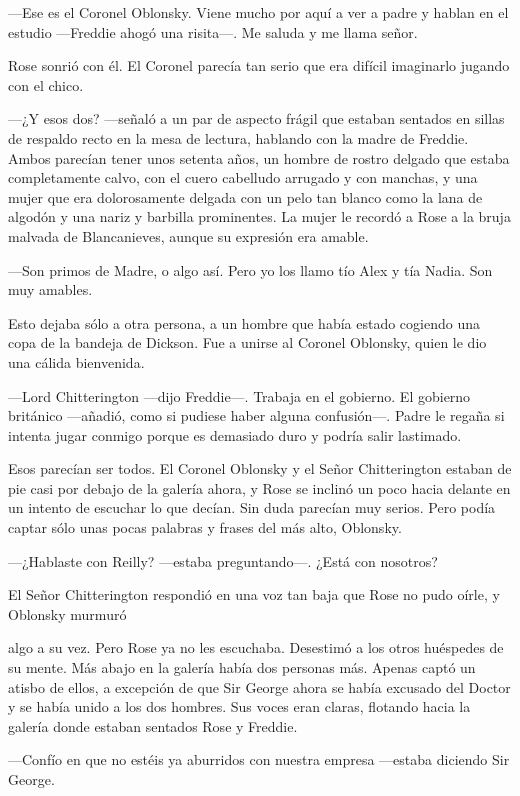 {---Ese es el Coronel Oblonsky. Viene mucho por aquí a ver a padre y
hablan en el estudio ---Freddie ahogó una risita---. Me saluda y me
llama señor.}

{Rose sonrió con él. El Coronel parecía tan serio que era difícil
imaginarlo jugando con el chico.}

{---¿Y esos dos? ---señaló a un par de aspecto frágil que estaban
sentados en sillas de respaldo recto en la mesa de lectura, hablando con
la madre de Freddie. Ambos parecían tener unos setenta años, un hombre
de rostro delgado que estaba completamente calvo, con el cuero cabelludo
arrugado y con manchas, y una mujer que era dolorosamente delgada con un
pelo tan blanco como la lana de algodón y una nariz y barbilla
prominentes. La mujer le recordó a Rose a la bruja malvada de
Blancanieves, aunque su expresión era amable.}

{---Son primos de Madre, o algo así. Pero yo los llamo tío Alex y tía
Nadia. Son muy amables.}

{Esto dejaba sólo a otra persona, a un hombre que había estado cogiendo
una copa de la bandeja de Dickson. Fue a unirse al Coronel Oblonsky,
quien le dio una cálida bienvenida.}

{---Lord Chitterington ---dijo Freddie---. Trabaja en el gobierno. El
gobierno británico ---añadió, como si pudiese haber alguna confusión---.
Padre le regaña si intenta jugar conmigo porque es demasiado duro y
podría salir lastimado.}

{Esos parecían ser todos. El Coronel Oblonsky y el Señor Chitterington
estaban de pie casi por debajo de la galería ahora, y Rose se inclinó un
poco hacia delante en un intento de escuchar lo que decían. Sin duda
parecían muy serios. Pero podía captar sólo unas pocas palabras y frases
del más alto, Oblonsky.}

{---¿Hablaste con Reilly? ---estaba preguntando---. ¿Está con
nosotros?}

{El Señor Chitterington respondió en una voz tan baja que Rose no pudo
oírle, y Oblonsky murmuró}

{algo a su vez. Pero Rose ya no les escuchaba. Desestimó a los otros
huéspedes de su mente. Más abajo en la galería había dos personas más.
Apenas captó un atisbo de ellos, a excepción de que Sir George ahora se
había excusado del Doctor y se había unido a los dos hombres. Sus voces
eran claras, flotando hacia la galería donde estaban sentados Rose y
Freddie.}

{---Confío en que no estéis ya aburridos con nuestra empresa ---estaba
diciendo Sir George.}

